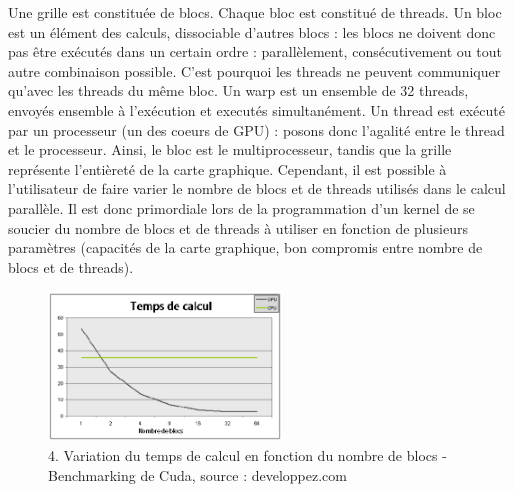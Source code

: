 \documentclass{report}
\begin{document}
Une grille est constituée de blocs. Chaque bloc est constitué de threads. Un bloc est un élément des calculs, dissociable d'autres blocs : les blocs ne doivent donc pas être exécutés dans un certain ordre : parallèlement, consécutivement ou tout autre combinaison possible. C'est pourquoi les threads ne peuvent communiquer qu'avec les threads du même bloc.\newline
Un warp est un ensemble de 32 threads, envoyés ensemble à l'exécution et executés simultanément. Un thread est exécuté par un processeur (un des coeurs de GPU) : posons donc l'agalité entre le thread et le processeur.\newline
Ainsi, le bloc est le multiprocesseur, tandis que la grille représente l'entièreté de la carte graphique. \newline
Cependant, il est possible à l'utilisateur de faire varier le nombre de blocs et de threads utilisés dans le calcul parallèle. Il est donc primordiale lors de la programmation d'un kernel de se soucier du nombre de blocs et de threads à utiliser en fonction de plusieurs paramètres (capacités de la carte graphique, bon compromis entre nombre de blocs et de threads).

\begin{figure}[!h]
\begin{center}
\includegraphics[height=150]{image_benchmark_cuda.png}
\end{center}
\caption{4. Variation du temps de calcul en fonction du nombre de blocs - Benchmarking de Cuda, source : developpez.com}
\label{test}
\end{figure} \newline
\end{document}
